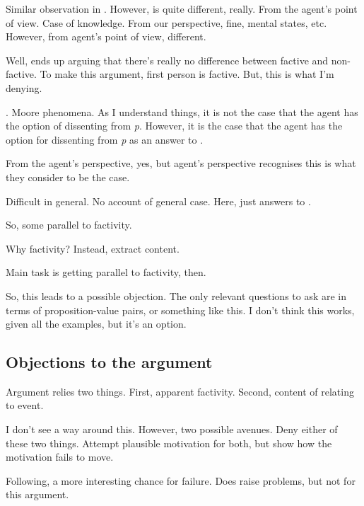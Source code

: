 \begin{note}[Distinction]
  Similar observation in \textcite[132ish]{Dancy:2000aa}.
  However, \citeauthor{Dancy:2000aa} is quite different, really.
  From the agent's point of view.
  Case of knowledge.
  From our perspective, fine, mental states, etc.
  However, from agent's point of view, different.

  Well, \citeauthor{Dancy:2000aa} ends up arguing that there's really no difference between factive and non-factive.
  To make this argument, first person is factive.
  But, this is what I'm denying.

  \citeauthor{Collins:1997wn}.
  \textcite[108+]{Dancy:2000aa}
  Moore phenomena.
  As I understand things, it is not the case that the agent has the option of dissenting from \emph{p}.
  However, it is the case that the agent has the option for dissenting from \emph{p} as an answer to \qWhy{}.

  From the agent's perspective, yes, but agent's perspective recognises this is what they consider to be the case.

  Difficult in general.
  No account of general case.
  Here, just answers to \qzS{}.
\end{note}

\begin{note}
  So, some parallel to factivity.

  Why factivity?
  Instead, extract content.

  Main task is getting parallel to factivity, then.
\end{note}

\begin{note}
  \begin{argument}
    {
      \color{blue}
      So, this leads to a possible objection.
      The only relevant questions to ask are in terms of proposition-value pairs, or something like this.
      I don't think this works, given all the examples, but it's an option.
    }
  \end{argument}
\end{note}

\subsection{Objections to the argument}
\label{sec:objections-argument}

\begin{note}
  Argument relies two things.
  First, apparent factivity.
  Second, content of \qzS{} relating to event.

  I don't see a way around this.
  However, two possible avenues.
  Deny either of these two things.
  Attempt plausible motivation for both, but show how the motivation fails to move.

  Following, a more interesting chance for failure.
  Does raise problems, but not for this argument.
\end{note}

